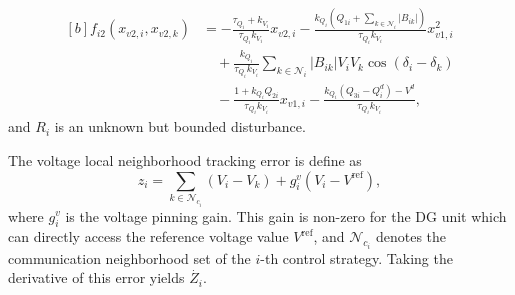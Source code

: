 \documentclass[]{interact}
\theoremstyle{plain}%
\theoremstyle{definition}
\theoremstyle{remark}
\begin{document}

\begin{equation}
\begin{aligned}[b]
f_{i2}(x_{v2,i}, x_{v2,k}) &= -\frac{\tau_{Q_i} + k_{V_i}}{\tau_{Q_i} k_{V_i}} x_{v2,i}  - \frac{k_{Q_i} \left( Q_{1i} + \sum_{k \in \mathcal{N}_i} |B_{ik}| \right)}{\tau_{Q_i} k_{V_i}} x_{v1,i}^2  \\
&\quad + \frac{k_{Q_i}}{\tau_{Q_i} k_{V_i}} \sum_{k \in \mathcal{N}_i} |B_{ik}| V_i V_k \cos(\delta_i - \delta_k)\\
&\quad - \frac{1 + k_{Q_i} Q_{2i}}{\tau_{Q_i} k_{V_i}} x_{v1,i}  - \frac{k_{Q_i} (Q_{3i} - Q_i^d) - V^d}{\tau_{Q_i} k_{V_i}},
\end{aligned}
\end{equation}
and \( R_i \) is an unknown but bounded disturbance.

The voltage local neighborhood tracking error \citep{Bl2020} is define as
\begin{equation}
\label{eq:z_i}
z_i = \sum_{k \in \mathcal{N}_{c_i}} (V_i - V_k) + g_i^v (V_i - V^{\text{ref}}),
\end{equation} 
where \( g_i^v \) is the voltage pinning gain. This gain is non-zero for the DG unit which can directly access the reference voltage value \( V^{\text{ref}} \), and \( \mathcal{N}_{c_i} \) denotes the communication neighborhood set of the \( i \)-th control strategy. Taking the derivative of this error yields $\dot{Z_i}$.
\end{document}
